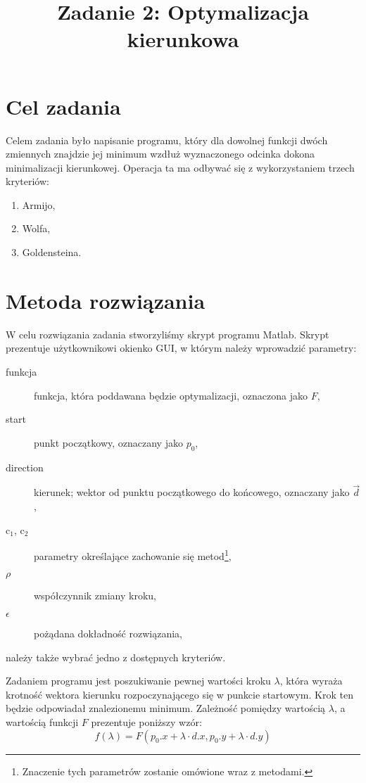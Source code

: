 \documentclass{classrep}
\author{%
  \studentinfo{Michał Janiszewski}{169485} \and
  \studentinfo{Leszek Wach}{xxxxxx}
}
\title{Zadanie 2: Optymalizacja kierunkowa}
\begin{document}
\maketitle

\section{Cel zadania}
Celem zadania było napisanie programu, który dla dowolnej funkcji dwóch zmiennych znajdzie jej minimum wzdłuż wyznaczonego odcinka \ppauza dokona minimalizacji kierunkowej. Operacja ta ma odbywać się z wykorzystaniem trzech kryteriów:
\begin{enumerate}
 \item Armijo,
 \item Wolfa,
 \item Goldensteina.
\end{enumerate}

\section{Metoda rozwiązania}
W celu rozwiązania zadania stworzyliśmy skrypt programu Matlab. Skrypt prezentuje użytkownikowi okienko GUI, w którym należy wprowadzić parametry:
\begin{description}
 \item[funkcja] funkcja, która poddawana będzie optymalizacji, oznaczona jako $F$,
 \item[start] punkt początkowy, oznaczany jako $p_0$,
 \item[direction] kierunek; wektor od punktu początkowego do końcowego, oznaczany jako $\overrightarrow{d}$,
 \item[c$_1$, c$_2$] parametry określające zachowanie się metod\footnote{Znaczenie tych parametrów zostanie omówione wraz z metodami.},
 \item[$\rho$] współczynnik zmiany kroku,
 \item[$\epsilon$] pożądana dokładność rozwiązania,
\end{description}
należy także wybrać jedno z dostępnych kryteriów.

Zadaniem programu jest poszukiwanie pewnej wartości kroku $\lambda$, która wyraża krotność wektora kierunku rozpoczynającego się w punkcie startowym. Krok ten będzie odpowiadał znalezionemu minimum. Zależność pomiędzy wartością $\lambda$, a wartością funkcji $F$ prezentuje poniższy wzór:
\begin{equation}
 f(\lambda) = F(p_0.x + \lambda \cdot d.x, p_0.y + \lambda \cdot d.y)
\end{equation}
\end{document}
